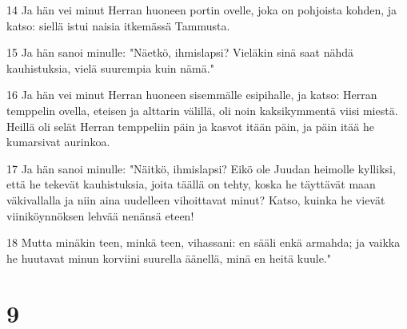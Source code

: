 \par 14 Ja hän vei minut Herran huoneen portin ovelle, joka on pohjoista kohden, ja katso: siellä istui naisia itkemässä Tammusta.
\par 15 Ja hän sanoi minulle: "Näetkö, ihmislapsi? Vieläkin sinä saat nähdä kauhistuksia, vielä suurempia kuin nämä."
\par 16 Ja hän vei minut Herran huoneen sisemmälle esipihalle, ja katso: Herran temppelin ovella, eteisen ja alttarin välillä, oli noin kaksikymmentä viisi miestä. Heillä oli selät Herran temppeliin päin ja kasvot itään päin, ja päin itää he kumarsivat aurinkoa.
\par 17 Ja hän sanoi minulle: "Näitkö, ihmislapsi? Eikö ole Juudan heimolle kylliksi, että he tekevät kauhistuksia, joita täällä on tehty, koska he täyttävät maan väkivallalla ja niin aina uudelleen vihoittavat minut? Katso, kuinka he vievät viiniköynnöksen lehvää nenänsä eteen!
\par 18 Mutta minäkin teen, minkä teen, vihassani: en sääli enkä armahda; ja vaikka he huutavat minun korviini suurella äänellä, minä en heitä kuule."

\chapter{9}

